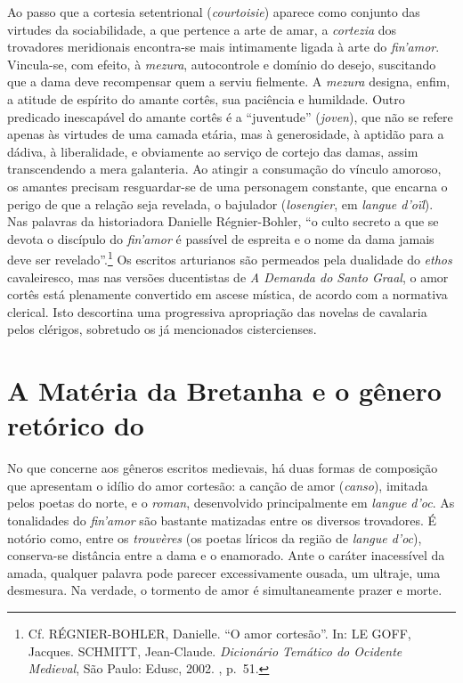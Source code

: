 Ao passo que a cortesia setentrional (\textit{courtoisie}) aparece como conjunto
das virtudes da sociabilidade, a que pertence a arte de amar, a
\textit{cortezia} dos trovadores meridionais encontra-se mais intimamente
ligada à arte do \textit{fin’amor}. Vincula-se, com efeito, à \textit{mezura},
autocontrole e domínio do desejo, suscitando que a dama deve recompensar quem a
serviu fielmente. A \textit{mezura} designa, enfim, a atitude de espírito do
amante cortês, sua paciência e humildade. Outro predicado inescapável do amante
cortês é a “juventude” (\textit{joven}), que não se refere apenas às virtudes
de uma camada etária, mas à generosidade, à aptidão para a dádiva, à
liberalidade, e obviamente ao serviço de cortejo das damas, assim transcendendo
a mera galanteria. Ao atingir a consumação do vínculo amoroso, os amantes
precisam resguardar-se de uma personagem constante, que encarna o perigo de que
a relação seja revelada, o bajulador (\textit{losengier}, em \textit{langue
d’oïl}). Nas palavras da historiadora Danielle Régnier-Bohler, “o culto secreto
a que se devota o discípulo do \textit{fin’amor} é passível de espreita e o
nome da dama jamais deve ser revelado”.\footnote{ Cf. RÉGNIER-BOHLER, Danielle.
“O amor cortesão”. In: LE GOFF, Jacques. SCHMITT, Jean-Claude.
\textit{Dicionário Temático do Ocidente Medieval}, São Paulo: Edusc, 2002. , p.~51.} 
Os escritos arturianos são permeados pela dualidade do
\textit{ethos} cavaleiresco, mas nas versões ducentistas de \textit{A Demanda
do Santo Graal}, o amor cortês está plenamente convertido em ascese mística, de
acordo com a normativa clerical. Isto descortina uma progressiva apropriação
das novelas de cavalaria pelos clérigos, sobretudo os já mencionados
cistercienses. 

\section{A Matéria da Bretanha e o gênero retórico do }

No que concerne aos gêneros escritos medievais, há duas formas de composição que
apresentam o idílio do amor cortesão: a canção de amor (\textit{canso}),
imitada pelos poetas do norte, e o \textit{roman}, desenvolvido principalmente
em \textit{langue d’oc}. As tonalidades do \textit{fin’amor} são bastante
matizadas entre os diversos trovadores. É notório como, entre os
\textit{trouvères} (os poetas líricos da região de \textit{langue d’oc}),
conserva-se distância entre a dama e o enamorado. Ante o caráter inacessível da
amada, qualquer palavra pode parecer excessivamente ousada, um ultraje, uma
desmesura. Na verdade, o tormento de amor é simultaneamente prazer e morte. 

